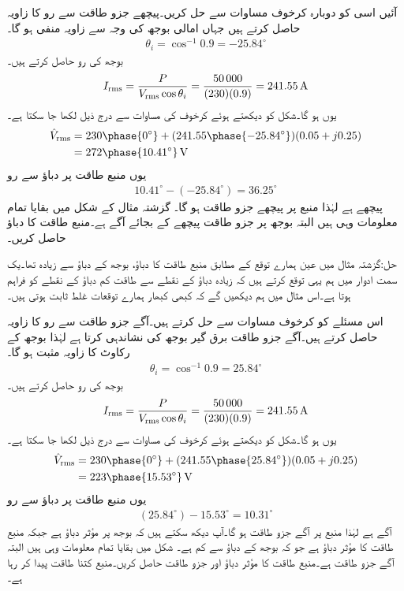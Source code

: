 آئیں اسی کو دوبارہ کرخوف مساوات سے حل کریں۔پیچھے جزو طاقت  سے رو کا زاویہ حاصل کرتے ہیں جہاں امالی بوجھ کی وجہ سے زاویہ منفی ہو گا۔
\begin{align*}
\theta_i=\cos^{-1} 0.9=-25.84^{\circ}
\end{align*}
بوجھ کی رو حاصل کرتے ہیں۔
\begin{align*}
{\ensuremath{I_{\textup{rms}}}}=\frac{P}{{V_{\textup{rms}}} \cos \theta_i}=\frac{\num{50000}}{(230)(0.9)}=\SI{241.55}{\ampere}
\end{align*}
یوں  ہو گا۔شکل کو دیکھتے ہوئے کرخوف کی مساوات سے درج ذیل لکھا جا سکتا ہے۔
\begin{align*}
\hat{V}_{\textup{rms}}&=230\phase{0^{\circ}}+(241.55\phase{-25.84^{\circ}})(0.05+j0.25)\\
&=272\phase{10.41^{\circ}}\,\si{\volt}
\end{align*}
یوں منبع طاقت پر دباؤ سے رو
\begin{align*}
10.41^{\circ}-(-25.84^{\circ})=36.25^{\circ}
\end{align*}
پیچھے ہے لہٰذا منبع پر پیچھے جزو طاقت  ہو گا۔
گزشتہ مثال کے شکل  میں بقایا تمام معلومات وہی ہیں البتہ بوجھ پر جزو طاقت پیچھے کے بجائے آگے ہے۔منبع طاقت کا دباؤ حاصل کریں۔

حل:گزشتہ مثال میں عین ہمارے توقع کے مطابق منبع طاقت کا دباؤ، بوجھ کے دباؤ سے زیادہ تھا۔یک سمت ادوار میں ہم یہی توقع کرتے ہیں کہ زیادہ دباؤ کے نقطے سے طاقت  کم دباؤ کے نقطے  کو فراہم ہوتا ہے۔اس مثال میں ہم دیکھیں گے کہ کبھی کبھار ہمارے توقعات غلط ثابت ہوتی ہیں۔ 
 
اس مسئلے کو کرخوف مساوات سے حل کرتے ہیں۔آگے جزو طاقت  سے رو کا زاویہ حاصل کرتے ہیں۔آگے جزو طاقت برق گیر بوجھ کی نشاندہی کرتا ہے لہٰذا بوجھ کے رکاوٹ کا زاویہ مثبت ہو گا۔
\begin{align*}
\theta_i=\cos^{-1} 0.9=25.84^{\circ}
\end{align*}
بوجھ کی رو حاصل کرتے ہیں۔
\begin{align*}
{\ensuremath{I_{\textup{rms}}}}=\frac{P}{{V_{\textup{rms}}} \cos \theta_i}=\frac{\num{50000}}{(230)(0.9)}=\SI{241.55}{\ampere}
\end{align*}
یوں  ہو گا۔شکل کو دیکھتے ہوئے کرخوف کی مساوات سے درج ذیل لکھا جا سکتا ہے۔
\begin{align*}
\hat{V}_{\textup{rms}}&=230\phase{0^{\circ}}+(241.55\phase{25.84^{\circ}})(0.05+j0.25)\\
&=223\phase{15.53^{\circ}}\,\si{\volt}
\end{align*}
یوں منبع طاقت پر دباؤ سے رو
\begin{align*}
(25.84^{\circ})-15.53^{\circ}=10.31^{\circ}
\end{align*}
آگے  ہے لہٰذا منبع پر آگے جزو طاقت  ہو گا۔آپ دیکھ سکتے ہیں کہ بوجھ پر مؤثر دباؤ  ہے جبکہ منبع طاقت کا مؤثر دباؤ  ہے جو کہ بوجھ کے دباؤ سے کم ہے۔
شکل  میں بقایا تمام معلومات وہی ہیں البتہ آگے جزو طاقت  ہے۔منبع طاقت کا مؤثر دباؤ اور جزو طاقت حاصل کریں۔منبع کتنا طاقت پیدا کر رہا ہے۔

